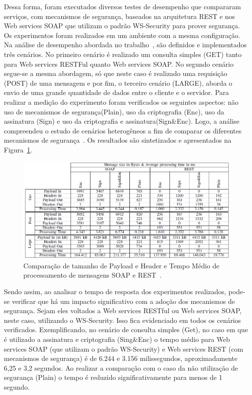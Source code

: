 Dessa forma, foram executados diversos testes de desempenho que compararam  serviços, com mecanismos de segurança, baseados na arquitetura REST e nos  Web services SOAP que utilizam o padrão WS-Security para prover segurança. Os experimentos foram realizados em um ambiente com a mesma configuração. Na análise de desempenho abordada no trabalho~\cite{verstichel}, são definidos e implementados três cenários. No primeiro cenário é realizado um consulta simples (GET) tanto para Web services RESTFul quanto Web services SOAP. No segundo cenário  segue-se a mesma abordagem, só que neste caso é realizado uma requisição (POST) de uma mensagem e por fim, o terceiro cenário (LARGE), aborda o envio de uma grande quantidade de dados entre o cliente e o servidor. Para realizar a medição do experimento foram verificados os seguintes aspectos: não uso de mecanismos de segurança(Plain), uso da criptografia (Enc), uso da assinatura (Sign) e uso da criptografia e assinatura(Sign\&Enc). Logo, a análise compreendeu o estudo de cenários heterogêneos a fim de comparar os diferentes mecanismos de segurança~\cite{verstichel}. Os resultados são sintetizados e apresentados na Figura~\ref{fig:comparativoSOAP_REST}.

\begin{figure}[!htb]
    \centering
    \includegraphics[width=1.0\textwidth]{analise_desempenho_estudo2.png}
    \caption{Comparação de tamanho de Payload e Header e Tempo Médio de processamento de mensagens SOAP e REST~\cite{verstichel}.}
    \label{fig:comparativoSOAP_REST}
\end{figure}

Sendo assim, ao analisar o tempo de resposta dos experimentos realizados, pode-se verificar que há um impacto significativo com a adoção dos mecanismos de segurança. Sejam eles voltados a Web services RESTful ou Web services SOAP, neste caso, utilizando o WS-Security. Isso fica evidenciado em todos os cenários verificados. Exemplificando, no cenário de consulta simples (Get), no caso em que é utilizado a assinatura e criptografia (Sing\&Enc) o tempo médio para Web services SOAP (que utilizam o padrão WS-Security) e Web services REST (com mecanismos de segurança) é de 6.244 e 3.156 milissegundos, aproximadamente 6,25 e 3,2 segundos. Ao realizar a comparação com o caso da não utilização de segurança (Plain) o tempo é reduzido significativamente para menos de 1 segundo.

